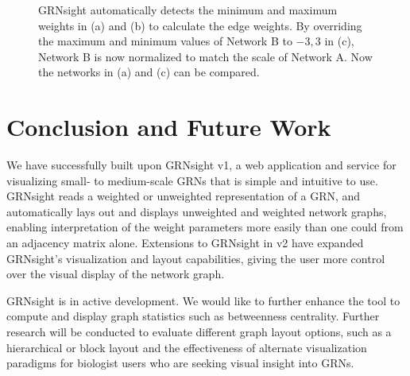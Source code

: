 \documentclass[sigconf,review]{acmart}
\begin{document}
\begin{figure}[h]
    \centering
    \caption{GRNsight automatically detects the minimum and maximum weights in (a) and (b) to calculate the edge weights. By overriding the maximum and minimum values of Network B to \(-3, 3\) in (c), Network B is now normalized to match the scale of Network A. Now the networks in (a) and (c) can be compared.}
    \label{fig:network-screenshots}
\end{figure}

\section{Conclusion and Future Work}
We have successfully built upon GRNsight v1, a web application and service for visualizing small- to medium-scale GRNs that is simple and intuitive to use. GRNsight reads a weighted or unweighted representation of a GRN, and automatically lays out and displays unweighted and weighted network graphs, enabling interpretation of the weight parameters more easily than one could from an adjacency matrix alone. Extensions to GRNsight in v2 have expanded GRNsight's visualization and layout capabilities, giving the user more control over the visual display of the network graph.

GRNsight is in active development. We would like to further enhance the tool to compute and display graph statistics such as betweenness centrality. Further research will be conducted to evaluate different graph layout options, such as a hierarchical or block layout and the effectiveness of alternate visualization paradigms for biologist users who are seeking visual insight into GRNs.


 
\end{document}
